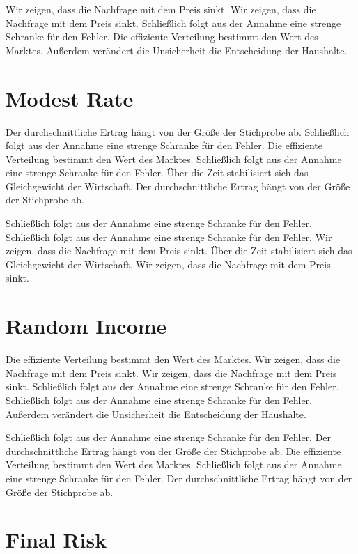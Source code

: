 \documentclass[11pt]{article}
\begin{document}
Wir zeigen, dass die Nachfrage mit dem Preis sinkt. Wir zeigen, dass die Nachfrage mit dem Preis sinkt. Schließlich folgt aus der Annahme eine strenge Schranke für den Fehler. Die effiziente Verteilung bestimmt den Wert des Marktes. Außerdem verändert die Unsicherheit die Entscheidung der Haushalte.

\section{Modest Rate}\label{sec:13}

Der durchschnittliche Ertrag hängt von der Größe der Stichprobe ab. Schließlich folgt aus der Annahme eine strenge Schranke für den Fehler. Die effiziente Verteilung bestimmt den Wert des Marktes. Schließlich folgt aus der Annahme eine strenge Schranke für den Fehler. Über die Zeit stabilisiert sich das Gleichgewicht der Wirtschaft. Der durchschnittliche Ertrag hängt von der Größe der Stichprobe ab.

Schließlich folgt aus der Annahme eine strenge Schranke für den Fehler. Schließlich folgt aus der Annahme eine strenge Schranke für den Fehler. Wir zeigen, dass die Nachfrage mit dem Preis sinkt. Über die Zeit stabilisiert sich das Gleichgewicht der Wirtschaft. Wir zeigen, dass die Nachfrage mit dem Preis sinkt.

\section{Random Income}\label{sec:14}

Die effiziente Verteilung bestimmt den Wert des Marktes. Wir zeigen, dass die Nachfrage mit dem Preis sinkt. Wir zeigen, dass die Nachfrage mit dem Preis sinkt. Schließlich folgt aus der Annahme eine strenge Schranke für den Fehler. Schließlich folgt aus der Annahme eine strenge Schranke für den Fehler. Außerdem verändert die Unsicherheit die Entscheidung der Haushalte.

Schließlich folgt aus der Annahme eine strenge Schranke für den Fehler. Der durchschnittliche Ertrag hängt von der Größe der Stichprobe ab. Die effiziente Verteilung bestimmt den Wert des Marktes. Schließlich folgt aus der Annahme eine strenge Schranke für den Fehler. Der durchschnittliche Ertrag hängt von der Größe der Stichprobe ab.

\section{Final Risk}\label{sec:15}
\end{document}
